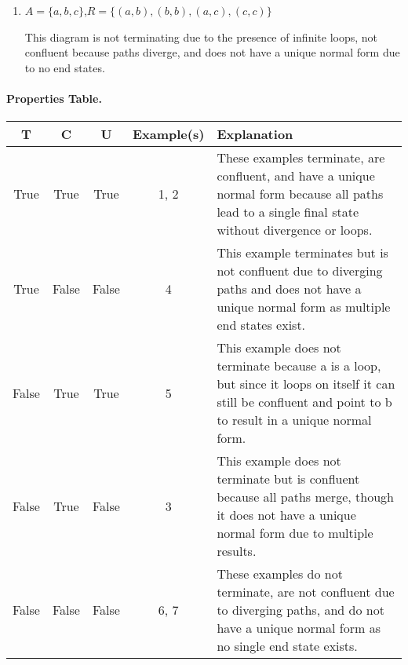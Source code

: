 \documentclass{article}
\theoremstyle{theorem}
\theoremstyle{definition}
\theoremstyle{remark}
\begin{document}
\begin{enumerate}
\vspace{2em}

    \item $A = \{ a, b, c \}$,\quad $R = \{ (a,b), (b,b), (a,c), (c,c) \}$

    \begin{center}
    \end{center}
    This diagram is not terminating due to the presence of infinite loops, not confluent because paths diverge, and does not have a unique normal form due to no end states.
\end{enumerate}

\paragraph{Properties Table.}
\begin{center}
\begin{tabular}{c c c c p{8cm}}
     T & C & U & Example(s) & Explanation \\ \hline
    True & True & True & 1, 2 & These examples terminate, are confluent, and have a unique normal form because all paths lead to a single final state without divergence or loops. \\
    True & False & False & 4 & This example terminates but is not confluent due to diverging paths and does not have a unique normal form as multiple end states exist. \\
    False & True & True & 5 & This example does not terminate because a is a loop, but since it loops on itself it can still be confluent and point to b to result in a unique normal form. \\
    False & True & False & 3 & This example does not terminate but is confluent because all paths merge, though it does not have a unique normal form due to multiple results. \\
    False & False & False & 6, 7 & These examples do not terminate, are not confluent due to diverging paths, and do not have a unique normal form as no single end state exists. \\
\end{tabular}
\end{center}
\end{document}
